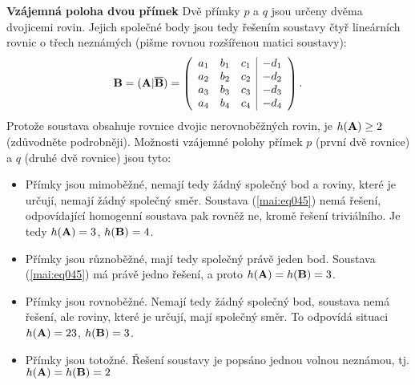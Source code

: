 \begin{mdframed}[style=mdexam]
  \begin{example}\label{mai:exam044}
    \textbf{Vzájemná poloha dvou přímek}\newline
    Dvě přímky \(p\) a \(q\) jsou určeny dvěma dvojicemi rovin. Jejich společné body jsou tedy
    řešením soustavy čtyř lineárních rovnic o třech neznámých (pišme rovnou rozšířenou matici
    soustavy):
    \begin{equation}\label{mai:eq045}
      \mathbf{B} = (\mathbf{A}\lvert\overline{\mathbf{B}}) =
      \left(
        \begin{array}{rrr|r}
          a_1 & b_1 & c_1 & -d_1    \\
          a_2 & b_2 & c_2 & -d_2    \\
          a_3 & b_3 & c_3 & -d_3    \\
          a_4 & b_4 & c_4 & -d_4
        \end{array}
      \right).
    \end{equation}
    Protože soustava obsahuje rovnice dvojic nerovnoběžných rovin, je \(h(\mathbf{A}) \geq 2\)
    (zdůvodněte podrobněji). Možnosti vzájemné polohy přímek \(p\) (první dvě rovnice) a \(q\)
    (druhé dvě rovnice) jsou tyto:
    \begin{itemize}
      \item Přímky jsou mimoběžné, nemají tedy žádný společný bod a roviny, které je určují, nemají
            žádný společný směr. Soustava (\ref{mai:eq045}) nemá řešení, odpovídající homogenní
            soustava pak rovněž ne, kromě řešení triviálního. Je tedy \(h(\mathbf{A}) = 3\),
            \(h(\mathbf{B}) = 4\).
      \item Přímky jsou různoběžné, mají tedy společný právě jeden bod. Soustava (\ref{mai:eq045})
            má právě jedno řešení, a proto \(h(\mathbf{A}) = h(\mathbf{B}) = 3\).
      \item Přímky jsou rovnoběžné. Nemají tedy žádný společný bod, soustava nemá řešení, ale
            roviny, které je určují, mají společný směr. To odpovídá situaci \(h(\mathbf{A}) = 23\),
            \(h(\mathbf{B}) = 3\).
      \item Přímky jsou totožné. Řešení soustavy je popsáno jednou volnou neznámou, tj.
            \(h(\mathbf{A}) = h(\mathbf{B}) = 2\)
    \end{itemize}
  \end{example}
\end{mdframed}